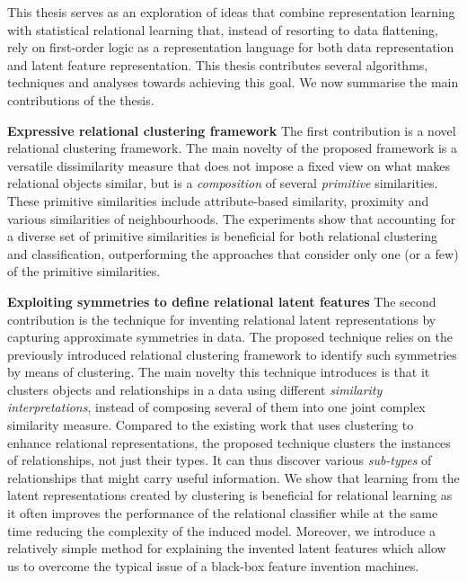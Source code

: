 This thesis serves as an exploration of ideas that combine representation learning with statistical relational learning that, instead of resorting to data flattening, rely on first-order logic as a representation language for both data representation and latent feature representation.
This thesis contributes several algorithms, techniques and analyses towards achieving this goal.
We now summarise the main contributions of the thesis.


\textbf{Expressive relational clustering framework}
The first contribution is a novel relational clustering framework.
The main novelty of the proposed framework is a versatile dissimilarity measure that does not impose a fixed view on what makes relational objects similar, but is a \textit{composition} of several \textit{primitive} similarities.
These primitive similarities include attribute-based similarity, proximity and various similarities of neighbourhoods.
The experiments show that accounting for a diverse set of primitive similarities is beneficial for both relational clustering and classification, outperforming the  approaches that  consider only one (or a few) of the primitive similarities.


\textbf{Exploiting symmetries to define relational latent features}
The second contribution is the technique for inventing relational latent representations by capturing approximate symmetries in data.
The proposed technique relies on the previously introduced relational clustering framework to identify such symmetries by means of clustering.
The main novelty this technique introduces is that it clusters objects and relationships in a data using different \textit{similarity interpretations}, instead of composing several of them into one joint complex similarity measure.
Compared to the existing work that uses clustering to enhance relational representations, the proposed technique clusters the instances of relationships, not just their types.
It can thus discover various \textit{sub-types} of relationships that might carry useful information.
We show that learning from the latent representations created by clustering is beneficial for relational learning as it often improves the performance of the relational classifier while at the same time reducing the complexity of the induced model.
Moreover, we introduce a relatively simple method for explaining the invented latent features which allow us to overcome the typical issue of a black-box feature invention machines.



